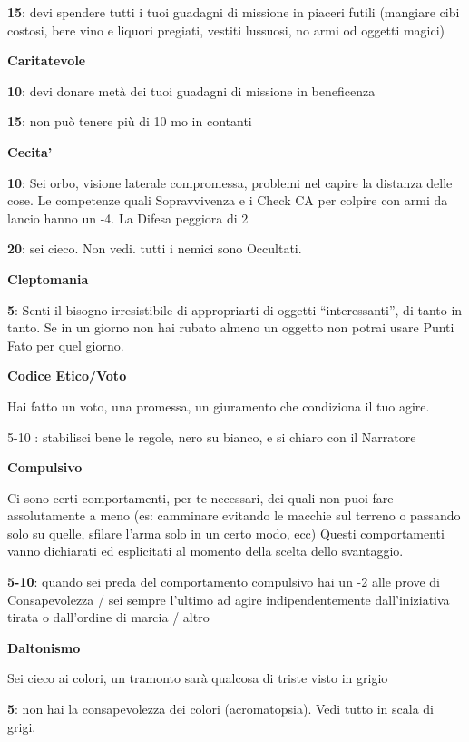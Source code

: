 \documentclass[a4paper,11pt,twoside,openany]{book}
\begin{document}
\textbf{15}: devi spendere tutti i tuoi guadagni di missione in piaceri futili (mangiare cibi costosi, bere vino e liquori pregiati, vestiti lussuosi, no armi od oggetti magici)

\textbf{Caritatevole}

\textbf{10}: devi donare metà dei tuoi guadagni di missione in beneficenza

\textbf{15}: non può tenere più di 10 mo in contanti

\textbf{Cecita'}

\textbf{10}: Sei orbo, visione laterale compromessa, problemi nel capire la distanza delle cose.
Le competenze quali Sopravvivenza e i Check CA per colpire con armi da lancio hanno
un -4. La Difesa peggiora di 2

\textbf{20}: sei cieco. Non vedi. tutti i nemici sono Occultati.

\textbf{Cleptomania}

\textbf{5}: Senti il bisogno irresistibile di appropriarti di oggetti “interessanti”, di tanto in tanto. Se in un giorno non hai rubato almeno un oggetto non potrai usare Punti Fato per quel giorno.

\textbf{Codice Etico/Voto}

Hai fatto un voto, una promessa, un giuramento che condiziona il tuo agire.

5-10 : stabilisci bene le regole, nero su bianco, e si chiaro con il Narratore

\textbf{Compulsivo}

Ci sono certi comportamenti, per te necessari, dei quali non puoi fare assolutamente a meno (es: camminare evitando le macchie sul terreno o passando solo su quelle, sfilare l'arma solo in un certo modo, ecc)
Questi comportamenti vanno dichiarati ed esplicitati al momento della scelta dello svantaggio.

\textbf{5-10}: quando sei preda del comportamento compulsivo hai un -2 alle prove di Consapevolezza / sei sempre l'ultimo ad agire indipendentemente dall'iniziativa tirata o dall'ordine di marcia / altro

\textbf{Daltonismo}

Sei cieco ai colori, un tramonto sarà qualcosa di triste visto in grigio

\textbf{5}: non hai la consapevolezza dei colori (acromatopsia). Vedi tutto in scala di grigi.
\end{document}
